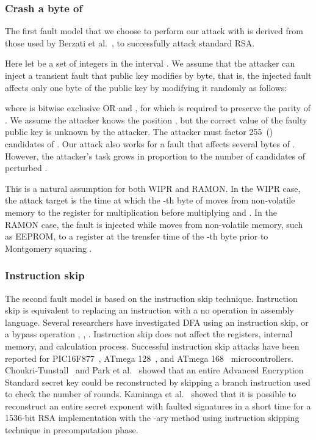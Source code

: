 \documentclass{article}
\begin{document}
\subsubsection{Crash a byte of }
The first fault model that we choose to perform our attack 
with is derived from those used by Berzati et al.~\cite{Berzati2}, \cite{Berzati3} 
to successfully attack standard RSA.

Here let  be a set of integers in the interval . 
We assume that the attacker can inject a transient fault that public key  modifies by byte, that is,
the injected fault affects only one byte of the public key by modifying it randomly as follows:

where  is bitwise exclusive OR and ,  
for  which 
is required to preserve the parity of . 
We assume the attacker knows the position , 
but the correct value of the faulty public key  is unknown by the attacker.
The attacker must factor 255~() candidates of . 
Our attack also works for a fault that affects several bytes of . 
However, the attacker's task grows in proportion to 
the number of candidates  of perturbed .

This is a natural assumption for both WIPR and RAMON. 
In the WIPR case, the attack target is the time at 
which the -th byte  of  moves from non-volatile memory to 
the register for multiplication before multiplying  and . 
In the RAMON case, the fault is injected while  moves from 
non-volatile memory, such as EEPROM, 
to a register at the trensfer time of the -th byte 
prior to Montgomery squaring .

\subsubsection{Instruction skip}
The second fault model is based on the instruction skip technique. 
Instruction skip is equivalent to replacing an instruction with a no operation 
in assembly language.
Several researchers have investigated DFA using an instruction skip, or a bypass operation 
\cite{RoundReduction}, \cite{park}, \cite{yoshikawa1}. 
Instruction skip does not affect the registers, internal memory, and calculation process.
Successful instruction skip attacks have been reported for 
PIC16F877~\cite{RoundReduction}, ATmega 128~\cite{park}, 
and ATmega 168~\cite{yoshikawa1} microcontrollers. 
Choukri-Tunstall~\cite{RoundReduction} and Park et al.~\cite{park} showed that 
an entire Advanced Encryption Standard secret key could be 
reconstructed by skipping a branch instruction used to 
check the number of rounds. 
Kaminaga et al.~\cite{KYS2015IEEE} showed that it is possible to 
reconstruct an entire secret exponent with  
faulted signatures in a short time for a 1536-bit RSA implementation with the 
-ary method using instruction skipping technique in precomputation phase.
\end{document}
